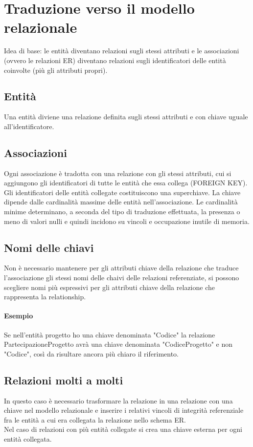 \section{Traduzione verso il modello relazionale}
Idea di base: le entità diventano relazioni sugli stessi attributi e le associazioni
(ovvero le relazioni ER) diventano relazioni sugli identificatori delle entità coinvolte
(più gli attributi propri).
\subsection{Entità}
Una entità diviene una relazione definita sugli stessi attributi e con chiave uguale
all'identificatore.
\subsection{Associazioni}
Ogni associazione è tradotta con una relazione con gli stessi attributi, cui si
aggiungono gli identificatori di tutte le entità che essa collega (FOREIGN KEY).\\
Gli identificatori delle entità collegate costituiscono una superchiave. La chiave
dipende dalle cardinalità massime delle entità nell'associazione. Le cardinalità minime
determinano, a seconda del tipo di traduzione effettuata, la presenza o meno di valori nulli e quindi
incidono su vincoli e occupazione inutile di memoria.
\subsection{Nomi delle chiavi}
Non è necessario mantenere per gli attributi chiave della relazione che traduce l'associazione gli
stessi nomi delle chaivi delle relazioni referenziate, si possono scegliere nomi più espressivi
per gli attributi chiave della relazione che rappresenta la relationship.
\paragraph*{Esempio} Se nell'entità progetto ho una chiave denominata "Codice" la
relazione PartecipazioneProgetto avrà una chiave denominata "CodiceProgetto" e non "Codice",
così da risultare ancora più chiaro il riferimento.
\subsection{Relazioni molti a molti}
In questo caso è necessario trasformare la relazione in una relazione con una chiave
nel modello relazionale e inserire i relativi vincoli di integrità referenziale fra le
entità a cui era collegata la relazione nello schema ER.\\ 
Nel caso di relazioni con più entità collegate si crea una chiave esterna per ogni entità
collegata.
